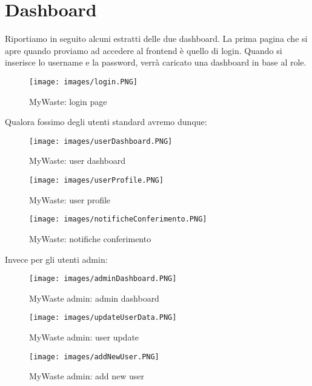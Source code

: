 \documentclass{report}
\begin{document}
\section{Dashboard}
Riportiamo in seguito alcuni estratti delle due dashboard.
La prima pagina che si apre quando proviamo ad accedere al frontend è quello di login.
Quando si inserisce lo username e la password, verrà caricato una dashboard in base al role.
\begin{figure}[h!]
    \begin{center}
        \texttt{[image: images/login.PNG]}  \end{center}
    \caption{MyWaste: login page}
    \label{fig: login}
\end{figure}
Qualora fossimo degli utenti standard avremo dunque:
\begin{figure}[h!]
    \begin{center}
        \texttt{[image: images/userDashboard.PNG]}  \end{center}
    \caption{MyWaste: user dashboard}
    \label{fig: userDashboard}
\end{figure}
\begin{figure}[h!]
    \begin{center}
        \texttt{[image: images/userProfile.PNG]}  \end{center}
    \caption{MyWaste: user profile}
    \label{fig: userProfile}
\end{figure}
\begin{figure}[h!]
    \begin{center}
        \texttt{[image: images/notificheConferimento.PNG]}  \end{center}
    \caption{MyWaste: notifiche conferimento}
    \label{fig: notify}
\end{figure}
Invece per gli utenti admin:
\begin{figure}[h!]
    \begin{center}
        \texttt{[image: images/adminDashboard.PNG]}  \end{center}
    \caption{MyWaste admin: admin dashboard}
    \label{fig: adminDashboard}
\end{figure}
\begin{figure}[h!]
    \begin{center}
        \texttt{[image: images/updateUserData.PNG]}  \end{center}
    \caption{MyWaste admin: user update}
    \label{fig: userUpdate}
\end{figure}
\begin{figure}[h!]
    \begin{center}
        \texttt{[image: images/addNewUser.PNG]}  \end{center}
    \caption{MyWaste admin: add new user}
    \label{fig: addNewUser}
\end{figure}
\end{document}
